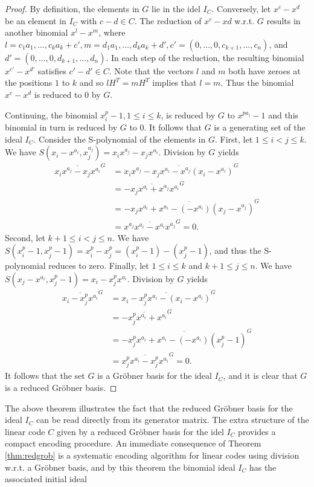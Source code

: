 \documentclass[english,bachelor]{liumaiex}
\begin{document}
\begin{proof}
By definition, the elements in $G$ lie in the idel $I_C$. Conversely, let $x^c-x^d$ be an element in $I_C$ with $c-d\in C$. The reduction of $x^c-x d$ w.r.t. $G$ results in another binomial $x^l-x^m$, where $l=c_1a_1,\dots,c_ka_k+c', m=d_1a_1,\dots,d_ka_k+d', c'=(0,\dots,0,c_{k+1},\dots,c_n)$, and $d'=(0,\dots,0,d_{k+1},\dots,d_n)$. In each step of the reduction, the resulting binomial $x^{c'}-x^{d'}$ satisfies $c'-d'\in C$. Note that the vectors $l$ and $m$ both have zeroes at the positions $1$ to $k$ and so $lH^T=mH^T$ implies that $l=m$. Thus the binomial $x^c-x^d$ is reduced to $0$ by $G$.

Continuing, the binomial $x_i^p-1, 1\leq i\leq k$, is reduced by $G$ to $x^{pa_i}-1$ and this binomial in turn is reduced by $G$ to $0$. It follows that $G$ is a generating set of the ideal $I_C$. Consider the S-polynomial of the elements in $G$. First, let $1\leq i<j\leq k$. We have $S(x_i-x^{a_i},x_j^{a_j})=x_ix^{a_j}-x_jx^{a_i}$. Division by $G$ yields
\begin{align*}
\overline{x_ix^{a_j}-x_jx^{a_i}}^G &= \overline{x_ix^{a_j}-x_jx^{a_i}-x^{a_j}(x_i-x^{a_i})}^G\\ &= \overline{-x_jx^{a_i}+x^{a_j}x^{a_i}}^G \\&= \overline{-x_jx^{a_i}+x^{a_i}-(-x^{a_i})(x_j-x^{a_j})}^G\\ &= \overline{x^{a_j}x^{a_i}-x^{a_i}x^{a_j}}^G=0.
\end{align*}
Second, let $k+1\leq i<j\leq n$. We have $S(x_i^p-1,x_j^p-1)=x_i^p-x_j^p=(x_i^p-1)-(x_j^p-1)$, and thus the S-polynomial reduces to zero. Finally, let $1\leq i\leq k$ and $k+1\leq j\leq n$. We have $S(x_j-x^{a_i},x_j^p-1)=x_i-x_j^px^{a_i}$. Division by $G$ yields
\begin{align*}
\overline{x_i-x_j^px^{a_i}}^G &= \overline{x_i-x_j^px^{a_i}-(x_i-x^{a_i})}^G \\&= \overline{-x_j^px^{a_i}+x^{a_i}}^G \\ &= \overline{-x_j^px^{a_i}+x^{a_i}-(-x^{a_i})(x_j^p-1)}^G \\ &= \overline{x_j^px^{a_i}-x_j^px^{a_i}}^G=0.
\end{align*}
It follows that the set $G$ is a Gröbner basis for the ideal $I_C$, and it is clear that $G$ is a reduced Gröbner basis.
\end{proof}
The above theorem illustrates the fact that the reduced Gröbner basis for the ideal $I_C$ can be read directly from its generator matrix. The extra structure of the linear code $C$ given by a reduced Gröbner basis for the idel $I_C$ provides a compact encoding procedure. An immediate consequence of Theorem \ref{thm:redgrob} is a systematic encoding algorithm for linear codes using division w.r.t. a Gröbner basis, and by this theorem the binomial ideal $I_C$ has the associated initial ideal
\end{document}
